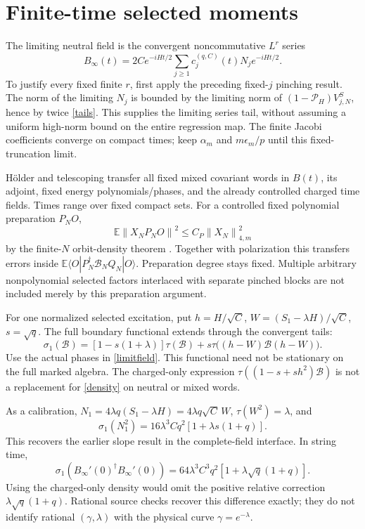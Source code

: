 \documentclass[11pt]{article}
\newcommand{\E}{\mathbb E}
\newcommand{\Pin}{\mathcal P_H}
\newcommand{\norm}[1]{\left\lVert#1\right\rVert}
\begin{document}
\newpage
\section{Finite-time selected moments}
The limiting neutral field is the convergent noncommutative $L^r$
series
\begin{equation}\label{limitfield}
 B_\infty(t)=2C e^{-iHt/2}
       \sum_{j\ge1}c_j^{(q,C)}(t)N_j e^{-iHt/2}.
\end{equation}
To justify every fixed finite $r$, first apply the preceding fixed-$j$
pinching result. The norm of the limiting $N_j$ is bounded by the
limiting norm of $(1-\Pin)V_{j,N}^S$, hence by twice \eqref{tails}.
This supplies the limiting series tail, without assuming a uniform
high-norm bound on the entire regression map. The finite Jacobi
coefficients converge on compact times; keep $\alpha_m$ and
$m\epsilon_m/p$ until this fixed-truncation limit.

H\"older and telescoping transfer all fixed mixed covariant words
in $B(t)$, its adjoint, fixed energy polynomials/phases, and the already
controlled charged time fields. Times range over fixed compact sets.
For a controlled fixed polynomial preparation $P_NO$,
\[
 \E\norm{X_NP_NO}^2\le C_P\norm{X_N}_{4,m}^2
\]
by the finite-$N$ orbit-density theorem \cite{prep}.
Together with polarization this transfers errors inside
$\E\langle O|P_N^\dagger\mathcal B_NQ_N|O\rangle$.
Preparation degree stays fixed. Multiple arbitrary nonpolynomial
selected factors interlaced with separate pinched blocks are not
included merely by this preparation argument.

For one normalized selected excitation, put
$h=H/\sqrt C$, $W=(S_1-\lambda H)/\sqrt C$, $s=\sqrt q$.
The full boundary functional \cite{higher} extends through the
convergent tails:
\begin{equation}\label{density}
 \sigma_1(\mathcal B)=
 [1-s(1+\lambda)]\tau(\mathcal B)
 +s\tau\bigl((h-W)\mathcal B(h-W)\bigr).
\end{equation}
Use the actual phases in \eqref{limitfield}. This functional need not
be stationary on the full marked algebra. The charged-only expression
$\tau((1-s+sh^2)\mathcal B)$ is not a replacement for \eqref{density}
on neutral or mixed words.

As a calibration, $N_1=4\lambda q(S_1-\lambda H)=4\lambda q\sqrt C\,W$,
$\tau(W^2)=\lambda$, and
\[
 \sigma_1(N_1^2)=16\lambda^3Cq^2[1+\lambda s(1+q)].
\]
This recovers the earlier slope result in the complete-field interface.
In string time,
\[
 \sigma_1(B_\infty'(0)^\dagger B_\infty'(0))
       =64\lambda^3C^3q^2[1+\lambda\sqrt q(1+q)] .
\]
Using the charged-only density would omit the positive relative
correction $\lambda\sqrt q(1+q)$. Rational source checks recover this
difference exactly; they do not identify rational $(\gamma,\lambda)$
with the physical curve $\gamma=e^{-\lambda}$.
\end{document}
